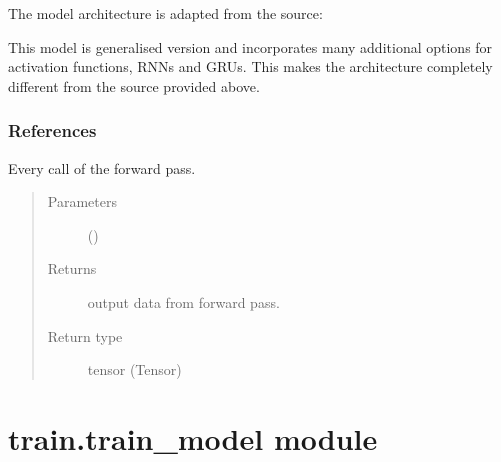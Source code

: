 \documentclass[letterpaper,10pt,english,openany,oneside]{sphinxmanual}
\begin{document}
\begin{fulllineitems}
The model architecture is adapted from the source:

This model is generalised version and incorporates many additional options for activation functions, RNNs and GRUs.
This makes the architecture completely different from the source provided above.
\subsubsection*{References}

\begin{fulllineitems}
\label{\detokenize{docs/source/train:train.model.Generalised_Recurrent_Model.forward}}
Every call of the forward pass.
\begin{quote}\begin{description}
\item[{Parameters}] \leavevmode
{} () \textendash{} 

\item[{Returns}] \leavevmode
output data from forward pass.

\item[{Return type}] \leavevmode
tensor (Tensor)

\end{description}\end{quote}

\end{fulllineitems}


\end{fulllineitems}



\section{train.train\_model module}
\label{\detokenize{docs/source/train:module-train.train_model}}\label{\detokenize{docs/source/train:train-train-model-module}}
\end{document}
